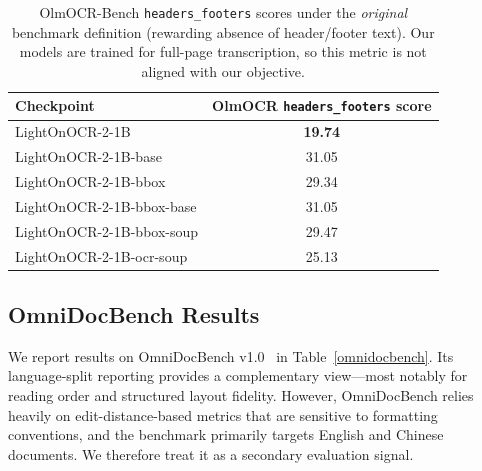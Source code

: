 \documentclass{article}
\newcommand{\bestA}[1]{\cellcolor{blue!12}\textbf{#1}}  %
\begin{document}
\begin{table}[h]
\centering
\small
\setlength{\tabcolsep}{6pt}
\begin{tabular}{lc}
\toprule
\textbf{Checkpoint} & \textbf{OlmOCR \texttt{headers\_footers} score} \\
\midrule
LightOnOCR-2-1B            & \bestA{19.74} \\
LightOnOCR-2-1B-base       & 31.05 \\
LightOnOCR-2-1B-bbox       & 29.34 \\
LightOnOCR-2-1B-bbox-base  & 31.05 \\
LightOnOCR-2-1B-bbox-soup  & 29.47 \\
LightOnOCR-2-1B-ocr-soup   & 25.13 \\
\bottomrule
\end{tabular}
\caption{OlmOCR-Bench \texttt{headers\_footers} scores under the \emph{original} benchmark definition (rewarding absence of header/footer text). Our models are trained for full-page transcription, so this metric is not aligned with our objective.}
\label{tab:headers_footers_effect}
\end{table}


\subsection{OmniDocBench Results}
\label{app:omnidocbench}
We report results on OmniDocBench v1.0~\cite{omnidocbench} in Table~\ref{omnidocbench}. Its language-split reporting provides a complementary view—most notably for reading order and structured layout fidelity. However, OmniDocBench relies heavily on edit-distance-based metrics that are sensitive to formatting conventions, and the benchmark primarily targets English and Chinese documents. We therefore treat it as a secondary evaluation signal.
\end{document}
